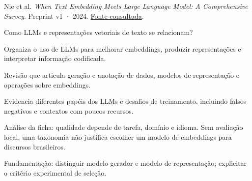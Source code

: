 {\small Nie et al. \textit{When Text Embedding Meets Large Language Model: A Comprehensive Survey}. Preprint v1 · 2024. \href{https://arxiv.org/pdf/2412.09165v1}{Fonte consultada}.\par}

Como LLMs e representações vetoriais de texto se relacionam?

Organiza o uso de LLMs para melhorar embeddings, produzir representações e interpretar informação codificada.

Revisão que articula geração e anotação de dados, modelos de representação e operações sobre embeddings.

Evidencia diferentes papéis dos LLMs e desafios de treinamento, incluindo falsos negativos e contextos com poucos recursos.

\begin{itemize}
\end{itemize}

Análise da ficha: qualidade depende de tarefa, domínio e idioma. Sem avaliação local, uma taxonomia não justifica escolher um modelo de embeddings para discursos brasileiros.

Fundamentação: distinguir modelo gerador e modelo de representação; explicitar o critério experimental de seleção.

